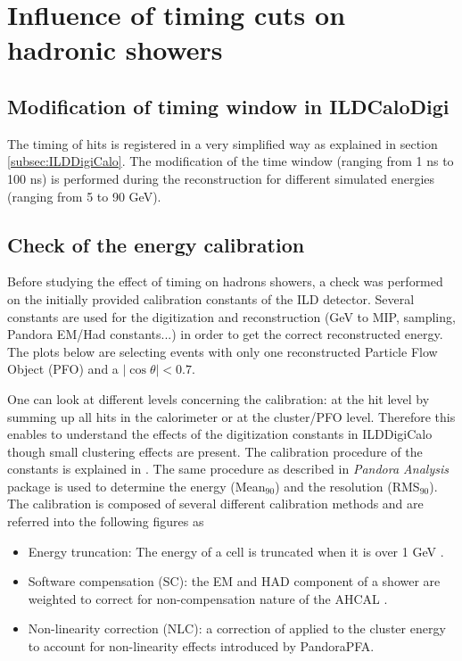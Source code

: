 \section{Influence of timing cuts on hadronic showers}
\label{sec:ILDTiming}

\subsection{Modification of timing window in ILDCaloDigi}

The timing of hits is registered in a very simplified way as explained in section \ref{subsec:ILDDigiCalo}. The modification of the time window (ranging from 1 ns to 100 ns) is performed during the reconstruction for different simulated \kzeroL{} energies (ranging from 5 to 90 GeV).

\subsection{Check of the energy calibration}

Before studying the effect of timing on hadrons showers, a check was performed on the initially provided calibration constants of the ILD detector. Several constants are used for the digitization and reconstruction (GeV to MIP, sampling, Pandora EM/Had constants...) in order to get the correct reconstructed energy. The plots below are selecting events with only one reconstructed Particle Flow Object (PFO) and a $|\cos\theta| < 0.7$.

One can look at different levels concerning the calibration: at the hit level by summing up all hits in the calorimeter or at the cluster/PFO level. Therefore this enables to understand the effects of the digitization constants in ILDDigiCalo though small clustering effects are present. The calibration procedure of the constants is explained in \cite{PandoraCalib}. The same procedure as described in \textit{Pandora Analysis} package is used to determine the energy (Mean$_{90}$) and the resolution (RMS$_{90}$). The calibration is composed of several different calibration methods and are referred into the following figures as
\begin{itemize}
  \item Energy truncation: The energy of a cell is truncated when it is over 1 GeV \cite{Tran:2017tgr}.
  \item Software compensation (SC): the EM and HAD component of a shower are weighted to correct for non-compensation nature of the AHCAL \cite{Tran:2017tgr}.
  \item Non-linearity correction (NLC): a correction of applied to the cluster energy to account for non-linearity effects introduced by PandoraPFA.
\end{itemize}

